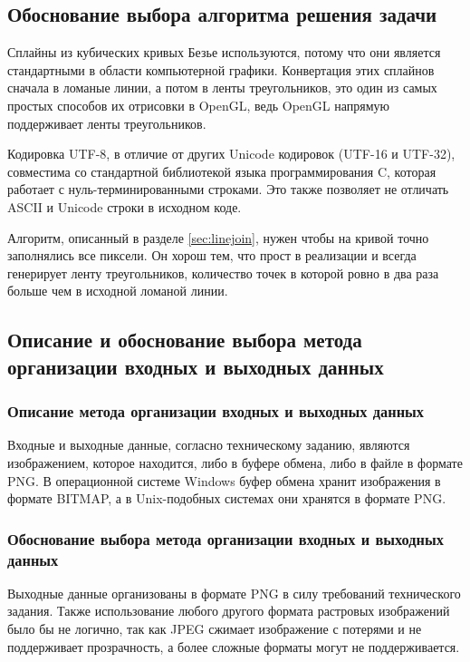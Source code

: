 \documentclass[a4paper,12pt]{article}
\begin{document}
  \subsection{Обоснование выбора алгоритма решения задачи}
  Сплайны из кубических кривых Безье используются, потому что они является стандартными в области компьютерной графики\cite{curves}.
  Конвертация этих сплайнов сначала в ломаные линии, а потом в ленты треугольников, это один из самых простых способов их отрисовки в OpenGL, ведь OpenGL напрямую поддерживает ленты треугольников\cite{triangleStrip}.

  Кодировка UTF-8, в отличие от других Unicode кодировок (UTF-16 и UTF-32),
  совместима со стандартной библиотекой языка программирования C, которая работает с нуль-терминированными строками.
  Это также позволяет не отличать ASCII и Unicode строки в исходном коде.

  Алгоритм, описанный в разделе \ref{sec:linejoin}, нужен чтобы на кривой точно заполнялись все пиксели.
  Он хорош тем, что прост в реализации и всегда генерирует ленту треугольников,
  количество точек в которой ровно в два раза больше чем в исходной ломаной линии.

  \subsection{Описание и обоснование выбора метода организации входных и выходных данных}
  \subsubsection{Описание метода организации входных и выходных данных}
  Входные и выходные данные, согласно техническому заданию, являются изображением,
  которое находится, либо в буфере обмена, либо в файле в формате PNG.
  В операционной системе Windows буфер обмена хранит изображения в формате BITMAP\cite{clipboardFormats},
  а в Unix-подобных системах они хранятся в формате PNG.

  \subsubsection{Обоснование выбора метода организации входных и выходных данных}
  Выходные данные организованы в формате PNG в силу требований технического задания.
  Также использование любого другого формата растровых изображений было бы не логично,
  так как JPEG сжимает изображение с потерями и не поддерживает прозрачность, а более сложные форматы могут не поддерживается.
\end{document}
